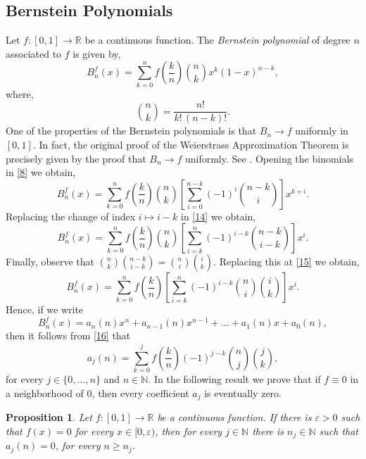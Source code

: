 \documentclass[11pt]{amsart}
\newtheorem{proposition}{Proposition}
\begin{document}
\subsection{Bernstein Polynomials}\label{Sub3.2}

Let $f\colon[0,1]\to\mathbb{R}$ be a continuous function. The \emph{Bernstein polynomial} of degree $n$ associated to $f$ is given by,
\begin{equation}\label{8}
	B_n^f(x)=\sum_{k=0}^{n}f\left(\frac{k}{n}\right)\binom{n}{k}x^k(1-x)^{n-k},
\end{equation}
where,
	\[\binom{n}{k}=\frac{n!}{k!\,(n-k)!}.\]
One of the properties of the Bernstein polynomials is that $B_n\to f$ uniformly in $[0,1]$. In fact, the original proof of the Weierstrass Approximation Theorem is precisely given by the proof that $B_n\to f$ uniformly. See \cite[Section $1.1$]{Lorentz}. Opening the binomials in \eqref{8} we obtain,
\begin{equation}\label{14}
	B_n^f(x)=\sum_{k=0}^{n}f\left(\frac{k}{n}\right)\binom{n}{k}\left[\sum_{i=0}^{n-k}(-1)^i\binom{n-k}{i}\right]x^{k+i}.
\end{equation}
Replacing the change of index $i\mapsto i-k$ in \eqref{14} we obtain,
\begin{equation}\label{15}
	B_n^f(x)=\sum_{k=0}^{n}f\left(\frac{k}{n}\right)\binom{n}{k}\left[\sum_{i=k}^{n}(-1)^{i-k}\binom{n-k}{i-k}\right]x^{i}.
\end{equation}
Finally, observe that $\binom{n}{k}\binom{n-k}{i-k}=\binom{n}{i}\binom{i}{k}$. Replacing this at \eqref {15} we obtain,
\begin{equation}\label{16}
	B_n^f(x)=\sum_{k=0}^{n}f\left(\frac{k}{n}\right)\left[\sum_{i=k}^{n}(-1)^{i-k}\binom{n}{i}\binom{i}{k}\right]x^{i}.
\end{equation}
Hence, if we write
	\[B_n^f(x)=a_n(n)x^n+a_{n-1}(n)x^{n-1}+\dots+a_1(n)x+a_0(n),\]
then it follows from \eqref{16} that
\begin{equation}\label{17}
	a_j(n)=\sum_{k=0}^{j}f\left(\frac{k}{n}\right)(-1)^{j-k}\binom{n}{j}\binom{j}{k},
\end{equation}
for every $j\in\{0,\dots,n\}$ and $n\in\mathbb{N}$. In the following result we prove that if $f\equiv0$ in a neighborhood of $0$, then every coefficient $a_j$ is eventually zero.

\begin{proposition}\label{P1}
	Let $f\colon[0,1]\to\mathbb{R}$ be a continuous function. If there is $\varepsilon>0$ such that $f(x)=0$ for every $x\in[0,\varepsilon)$, then for every $j\in\mathbb{N}$ there is $n_j\in\mathbb{N}$ such that $a_j(n)=0$, for every $n\geqslant n_j$.
\end{proposition}
\end{document}
